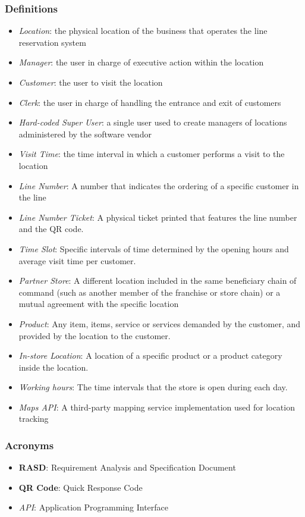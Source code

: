 \subsubsection{Definitions}
\begin{itemize}
    \item \textit{Location}: the physical location of the business that operates the line reservation system
    \item \textit{Manager}: the user in charge of executive action within the location
    \item \textit{Customer}: the user to visit the location
    \item \textit{Clerk}: the user in charge of handling the entrance and exit of customers
    \item \textit{Hard-coded Super User}: a single user used to create managers of locations administered by the software vendor
    \item \textit{Visit Time}: the time interval in which a customer performs a visit to the location
    \item \textit{Line Number}: A number that indicates the ordering of a specific customer in the line
    \item \textit{Line Number Ticket}: A physical ticket printed that features the line number and the QR code.
    \item \textit{Time Slot}: Specific intervals of time determined by the opening hours and average visit time per customer.
    \item \textit{Partner Store}: A different location included in the same beneficiary chain of command (such as another member of the franchise or store chain) or a mutual agreement with the specific location
    \item \textit{Product}: Any item, items, service or services demanded by the customer, and provided by the location to the customer.
    \item \textit{In-store Location}: A location of a specific product or a product category inside the location.
    \item \textit{Working hours}: The time intervals that the store is open during each day.
    \item \textit{Maps API}: A third-party mapping service implementation used for location tracking
\end{itemize}
\subsubsection{Acronyms}
\begin{itemize}
    \item \textbf{RASD}: Requirement Analysis and Specification Document
    \item \textbf{QR Code}: Quick Response Code
    \item \textit{API}: Application Programming Interface
\end{itemize}
